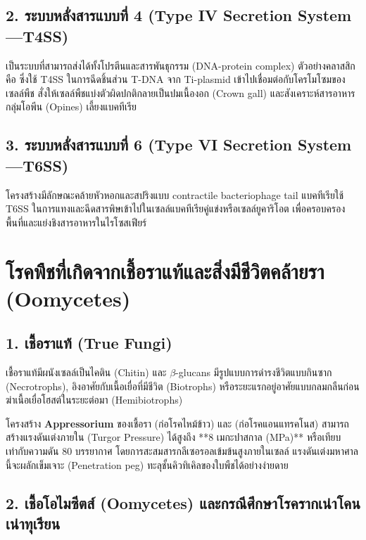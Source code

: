 \subsection{2. ระบบหลั่งสารแบบที่ 4 (Type IV Secretion System —T4SS)}
เป็นระบบที่สามารถส่งได้ทั้งโปรตีนและสารพันธุกรรม (DNA-protein complex) ตัวอย่างคลาสสิกคือ  ซึ่งใช้ T4SS ในการฉีดชิ้นส่วน T-DNA จาก Ti-plasmid เข้าไปเชื่อมต่อกับโครโมโซมของเซลล์พืช สั่งให้เซลล์พืชแบ่งตัวผิดปกติกลายเป็นปมเนื้องอก (Crown gall) และสังเคราะห์สารอาหารกลุ่มโอพีน (Opines) เลี้ยงแบคทีเรีย

\subsection{3. ระบบหลั่งสารแบบที่ 6 (Type VI Secretion System —T6SS)}
โครงสร้างมีลักษณะคล้ายหัวหอกและสปริงแบบ contractile bacteriophage tail แบคทีเรียใช้ T6SS ในการแทงและฉีดสารพิษเข้าไปในเซลล์แบคทีเรียคู่แข่งหรือเซลล์ยูคาริโอต เพื่อครอบครองพื้นที่และแย่งชิงสารอาหารในไรโซสเฟียร์

\section{โรคพืชที่เกิดจากเชื้อราแท้และสิ่งมีชีวิตคล้ายรา (Oomycetes)}

\subsection{1. เชื้อราแท้ (True Fungi)}
เชื้อราแท้มีผนังเซลล์เป็นไคติน (Chitin) และ $\beta$-glucans มีรูปแบบการดำรงชีวิตแบบกินซาก (Necrotrophs), อิงอาศัยกับเนื้อเยื่อที่มีชีวิต (Biotrophs) หรือระยะแรกอยู่อาศัยแบบกลมกลืนก่อนฆ่าเนื้อเยื่อโฮสต์ในระยะต่อมา (Hemibiotrophs)

โครงสร้าง \textbf{Appressorium} ของเชื้อรา  (ก่อโรคไหม้ข้าว) และ  (ก่อโรคแอนแทรคโนส) สามารถสร้างแรงดันเต่งภายใน (Turgor Pressure) ได้สูงถึง **8 เมกะปาสกาล (MPa)** หรือเทียบเท่ากับความดัน 80 บรรยากาศ โดยการสะสมสารกลีเซอรอลเข้มข้นสูงภายในเซลล์ แรงดันเต่งมหาศาลนี้จะผลักเข็มเจาะ (Penetration peg) ทะลุชั้นคิวทิเคิลของใบพืชได้อย่างง่ายดาย

\subsection{2. เชื้อโอไมซีตส์ (Oomycetes) และกรณีศึกษาโรครากเน่าโคนเน่าทุเรียน}

